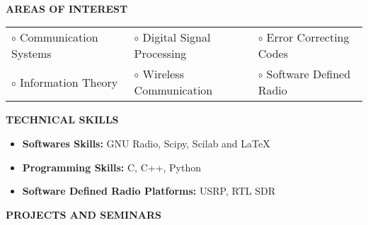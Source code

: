 \documentclass[a4paper,10pt]{article}
\begin{document}
{\qquad \\ \\ \\ \\ \\ \\ \\ \\ \\ \\ \\ \\ \\}

  \colorbox{titleColor}{\parbox{6.5in}{\textbf{AREAS OF INTEREST}}}

    \begin{tabular}{p{2in}p{2in}p{2in}}
      $\circ$ Communication Systems	&$\circ$ Digital Signal Processing	&$\circ$ Error Correcting Codes \\
      $\circ$ Information Theory	&$\circ$ Wireless Communication 	&$\circ$ Software Defined Radio \\
    \end{tabular}

  \colorbox{titleColor}{\parbox{6.5in}{\textbf{TECHNICAL SKILLS}}}
  
    \begin{itemize}
      \setlength{\itemsep}{1pt}
      \item \textbf{{Softwares Skills:}} GNU Radio, Scipy, Scilab and \LaTeX
      \item \textbf{{Programming Skills:}} C, C++, Python
      \item \textbf{{Software Defined Radio Platforms:}} USRP, RTL SDR
    \end{itemize}

  \colorbox{titleColor}{\parbox{6.5in}{\textbf{PROJECTS AND SEMINARS}}}
\end{document}
